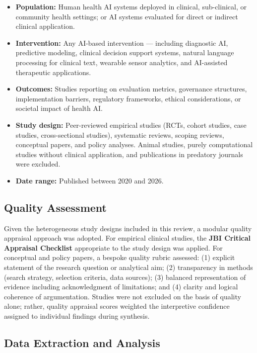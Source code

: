 \begin{itemize}[itemsep=0.2em]
\item \textbf{Population:} Human health AI systems deployed in clinical,
  sub-clinical, or community health settings; or AI systems evaluated for
  direct or indirect clinical application.
\item \textbf{Intervention:} Any AI-based intervention — including diagnostic
  AI, predictive modeling, clinical decision support systems, natural language
  processing for clinical text, wearable sensor analytics, and AI-assisted
  therapeutic applications.
\item \textbf{Outcomes:} Studies reporting on evaluation metrics, governance
  structures, implementation barriers, regulatory frameworks, ethical
  considerations, or societal impact of health AI.
\item \textbf{Study design:} Peer-reviewed empirical studies (RCTs, cohort
  studies, case studies, cross-sectional studies), systematic reviews,
  scoping reviews, conceptual papers, and policy analyses. Animal studies,
  purely computational studies without clinical application, and publications
  in predatory journals were excluded.
\item \textbf{Date range:} Published between 2020 and 2026.
\end{itemize}

\subsection{Quality Assessment}
\label{sec:quality_assessment}

Given the heterogeneous study designs included in this review, a modular
quality appraisal approach was adopted. For empirical clinical studies,
the \textbf{JBI Critical Appraisal Checklist} appropriate to the study
design was applied. For conceptual and policy papers, a bespoke quality
rubric assessed: (1) explicit statement of the research question or
analytical aim; (2) transparency in methods (search strategy, selection
criteria, data sources); (3) balanced representation of evidence including
acknowledgment of limitations; and (4) clarity and logical coherence of
argumentation. Studies were not excluded on the basis of quality alone;
rather, quality appraisal scores weighted the interpretive confidence
assigned to individual findings during synthesis.

\subsection{Data Extraction and Analysis}
\label{sec:data_extraction}

